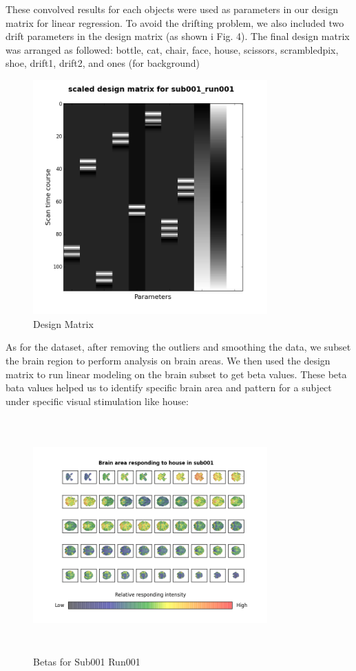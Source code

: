 \documentclass[11pt,twocolumn]{article}
\begin{document}
These convolved results for each objects were used as parameters in 
our design matrix for linear regression. To avoid the drifting problem, we also 
included two drift parameters in the design matrix (as shown i Fig. 4). 
The final design matrix was arranged as followed: 
bottle, cat, chair, face, house, scissors, scrambledpix, 
shoe, drift1, drift2, and ones (for background) 
\begin{figure}[h!]
\centering
\includegraphics[width=90mm]{design_matrix_sub001_run001.png}
\caption{Design Matrix}
\end{figure}

As for the dataset, after removing the outliers and smoothing the data, 
we subset the brain region to perform analysis on brain areas.
We then used the design matrix to run linear modeling on the brain subset 
to get beta values. 
These beta bata values helped us to identify specific brain area and 
pattern for a subject under specific visual stimulation like house:

\begin{figure}[h!]
\centering
\includegraphics[width=90mm, height = 90mm]{betas_for_sub001_run001_house.png}
\caption{Betas for Sub001 Run001}
\end{figure}
\end{document}
